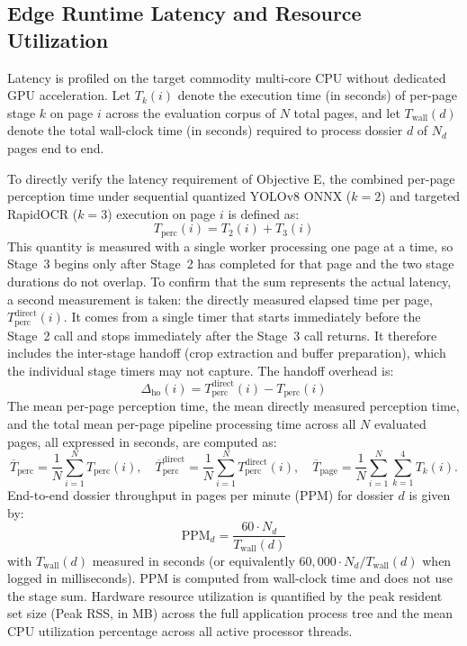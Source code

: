 \subsection{Edge Runtime Latency and Resource Utilization}
\label{sec:eval_latency_resource}

Latency is profiled on the target commodity multi-core CPU without dedicated GPU acceleration. Let $T_k(i)$ denote the execution time (in seconds) of per-page stage $k$ on page $i$ across the evaluation corpus of $N$ total pages, and let $T_{\mathrm{wall}}(d)$ denote the total wall-clock time (in seconds) required to process dossier $d$ of $N_d$ pages end to end.

To directly verify the latency requirement of Objective E, the combined per-page perception time under sequential quantized YOLOv8 ONNX ($k=2$) and targeted RapidOCR ($k=3$) execution on page $i$ is defined as:
\begin{equation}
\label{eq:perception_latency}
T_{\mathrm{perc}}(i)=T_2(i)+T_3(i)
\end{equation}
\indent This quantity is measured with a single worker processing one page at a time, so Stage~3 begins only after Stage~2 has completed for that page and the two stage durations do not overlap. To confirm that the sum represents the actual latency, a second measurement is taken: the directly measured elapsed time per page, $T_{\mathrm{perc}}^{\mathrm{direct}}(i)$. It comes from a single timer that starts immediately before the Stage~2 call and stops immediately after the Stage~3 call returns. It therefore includes the inter-stage handoff (crop extraction and buffer preparation), which the individual stage timers may not capture. The handoff overhead is:
\begin{equation}
\label{eq:handoff_overhead}
\Delta_{\mathrm{ho}}(i)=T_{\mathrm{perc}}^{\mathrm{direct}}(i)-T_{\mathrm{perc}}(i)
\end{equation}
\indent The mean per-page perception time, the mean directly measured perception time, and the total mean per-page pipeline processing time across all $N$ evaluated pages, all expressed in seconds, are computed as:
\begin{equation}
\label{eq:mean_times}
\overline T_{\mathrm{perc}}=\frac{1}{N}\sum_{i=1}^N T_{\mathrm{perc}}(i),\quad
\overline T_{\mathrm{perc}}^{\mathrm{direct}}=\frac{1}{N}\sum_{i=1}^N T_{\mathrm{perc}}^{\mathrm{direct}}(i),\quad
\overline T_{\mathrm{page}}=\frac{1}{N}\sum_{i=1}^N\sum_{k=1}^{4}T_k(i).
\end{equation}
End-to-end dossier throughput in pages per minute (PPM) for dossier $d$ is given by:
\begin{equation}
\label{eq:throughput_ppm}
\text{PPM}_d = \frac{60 \cdot N_d}{T_{\text{wall}}(d)}
\end{equation}
with $T_{\mathrm{wall}}(d)$ measured in seconds (or equivalently $60{,}000\cdot N_d/T_{\mathrm{wall}}(d)$ when logged in milliseconds). PPM is computed from wall-clock time and does not use the stage sum. Hardware resource utilization is quantified by the peak resident set size (Peak RSS, in MB) across the full application process tree and the mean CPU utilization percentage across all active processor threads.


